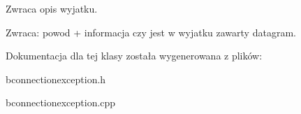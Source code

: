 Zwraca opis wyjatku. 

\begin{Desc}
\item[Zwraca:]powod + informacja czy jest w wyjatku zawarty datagram. \end{Desc}


Dokumentacja dla tej klasy została wygenerowana z plików:\begin{CompactItemize}
\item 
bconnectionexception.h\item 
bconnectionexception.cpp\end{CompactItemize}
